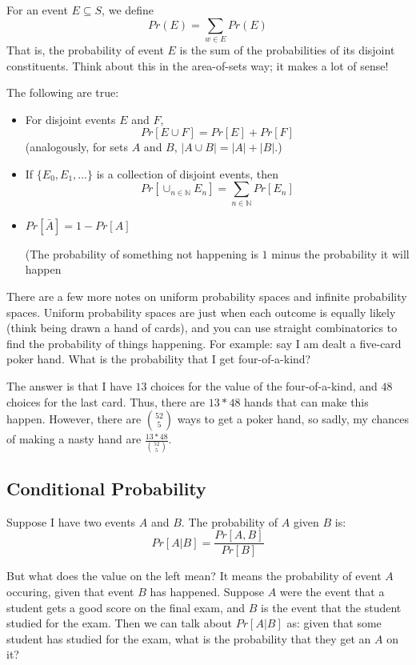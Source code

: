 \documentclass[11pt]{article}
\begin{document}
	For an event $E \subseteq S$, we define
	$$Pr(E) = \sum_{w \in E} Pr(E)$$
	That is, the probability of event $E$ is the sum of the probabilities of its disjoint 
	constituents.  Think about this in the area-of-sets way; it makes a lot of sense!
	
	The following are true:
	
	\begin{itemize}
		\item For disjoint events $E$ and $F$, 
		$$Pr[E \cup F] = Pr[E] + Pr[F]$$
		(analogously, for sets $A$ and $B$, $|A \cup B| = |A| + |B|$.)
		
		\item
			If $\{ E_0, E_1, \ldots \}$ is a collection of disjoint events, then
			$$Pr \left[ \cup_{n \in \mathbb N} E_n \right] = \sum_{n \in \mathbb N} Pr[E_n]$$
			
		\item		$Pr[\bar{A}] = 1 - Pr[A]$
		
			(The probability of something not happening is $1$ minus the probability it will
			happen
	\end{itemize}
	
	There are a few more notes on uniform probability spaces and infinite probability spaces.  Uniform probability spaces are just when each outcome is equally likely
	(think being drawn a hand of cards), and you can use straight combinatorics
	to find the probability of things happening.  For example: say I am dealt a five-card
	poker hand.  	What is the probability that I get four-of-a-kind?
	
	The answer is that I have $13$ choices for the value of the four-of-a-kind, and
	$48$ choices for the last card.  Thus, there are $13*48$ hands that can make 
	this happen.  However, there are $\binom{52}{5}$ ways to get  a poker hand,
	so sadly, my chances of making a nasty hand are $\frac{13*48}{\binom{52}{5}}$.
	
	\subsection{Conditional Probability} 
	Suppose I have two events $A$ and $B$.  The probability of $A$ given $B$ is:
	$$Pr[A | B] = \frac{Pr[A, B]}{Pr[B]}$$
	
	But what does the value on the left mean?  It means the probability of event
	$A$ occuring, given that event $B$ has happened.  Suppose $A$ were the event
	that a student gets a good score on the final exam, and $B$ is the event
	that the student studied for the exam.  Then we can talk about $Pr[A | B]$ as:
	given that some student has studied for the exam, what is the probability that
	they get an $A$ on it?  
	
\end{document}
